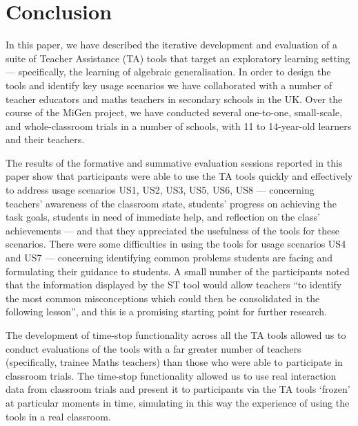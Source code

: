 \section{Conclusion}
\label{sec:conclusion}

In this paper, we have described the iterative development and evaluation of a suite
of Teacher Assistance (TA) tools that target an exploratory learning setting ---
specifically, the learning of algebraic generalisation.
In order to design the tools and identify key usage scenarios 
we have collaborated with a number of teacher educators and 
maths teachers in secondary schools in the UK. 
Over the course of the MiGen project, we have conducted several one-to-one, 
small-scale, and whole-classroom trials in a number of 
schools, with 11 to 14-year-old learners and their teachers. 

The results of the formative and summative evaluation sessions reported
in this paper show that participants were able to use the TA tools quickly and 
effectively to address usage scenarios US1, US2, US3, US5, US6, US8 ---
concerning teachers' awareness of the classroom state, students' progress 
on achieving the task goals, students in need of immediate help,
and reflection on the class' achievements ---
and that they appreciated the usefulness of the tools for these scenarios. 
There were some difficulties in using the tools for usage scenarios US4 and US7 ---
concerning identifying common problems
students are facing and formulating their guidance to students. 
A small number of the participants noted 
that the information displayed by the ST tool would 
allow teachers ``to identify the most common misconceptions which could then be
consolidated in the following lesson'', and this is a promising
starting point for further research. 

The development of time-stop functionality across all the TA tools 
allowed us to conduct evaluations of the tools with a far greater
number of teachers (specifically, trainee Maths teachers) 
than those who were able to participate in classroom trials. 
The time-stop functionality allowed us to use real interaction data 
from classroom trials and present it to participants
via the TA tools `frozen' at particular moments in time,  
simulating in this way the experience of using the tools in a real classroom. 

